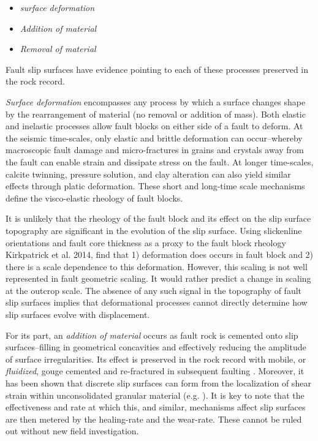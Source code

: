 \documentclass[12pt,a4paper]{article}
\begin{document}
\begin{itemize}
	\item[] \textit{surface deformation}
	\item[] \textit{Addition of material}
	\item[] \textit{Removal of material}
\end{itemize}

Fault slip surfaces have evidence pointing to each of these processes preserved in the rock record.

\textit{Surface deformation} encompasses any process by which a surface changes shape by the rearrangement of material (no removal or addition of mass). Both elastic and inelastic processes allow fault blocks on either side of a fault to deform. At the seismic time-scales, only elastic and brittle deformation can occur--whereby macroscopic fault damage and micro-fractures in grains and crystals away from the fault can enable strain and dissipate stress on the fault. At longer time-scales, calcite twinning, pressure solution, and clay alteration can also yield similar effects through platic deformation. These short and long-time scale mechanisms define the visco-elastic rheology of fault blocks.

It is unlikely that the rheology of the fault block and its effect on the slip surface topography are significant in the evolution of the slip surface. Using slickenline orientations and fault core thickness as a proxy to the fault block rheology Kirkpatrick et al. 2014, find that 1) deformation does occurs in fault block and 2) there is a scale dependence to this deformation. However, this scaling is not well represented in fault geometric scaling. It would rather predict a change in scaling at the outcrop scale. The absence of any such signal in the topography of fault slip surfaces implies that deformational processes cannot directly determine how slip surfaces evolve with displacement.

For its part, an \textit{addition of material} occurs as fault rock is cemented onto slip surfaces--filling in geometrical concavities and effectively reducing the amplitude of surface irregularities. Its effect is preserved in the rock record with mobile, or \textit{fluidized}, gouge cemented and re-fractured in subsequent faulting \cite{sagy2009geometric, shervais2016smoothing}. Moreover, it has been shown that discrete slip surfaces can form from the localization of shear strain within unconsolidated granular material (e.g. \cite{chambon2006thickness}). It is key to note that the effectiveness and rate at which this, and similar, mechanisms affect slip surfaces are then metered by the healing-rate and the wear-rate. These cannot be ruled out without new field investigation.
\end{document}
